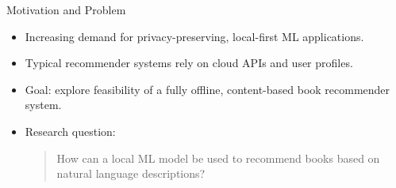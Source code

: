 \begin{frame}{Motivation and Problem}
\begin{itemize}
  \item Increasing demand for privacy-preserving, local-first ML applications.
  \item Typical recommender systems rely on cloud APIs and user profiles.
  \item Goal: explore feasibility of a fully offline, content-based book recommender system.
  \item Research question:
    \begin{quote}
    How can a local ML model be used to recommend books based on natural language descriptions?
    \end{quote}
\end{itemize}
\end{frame}